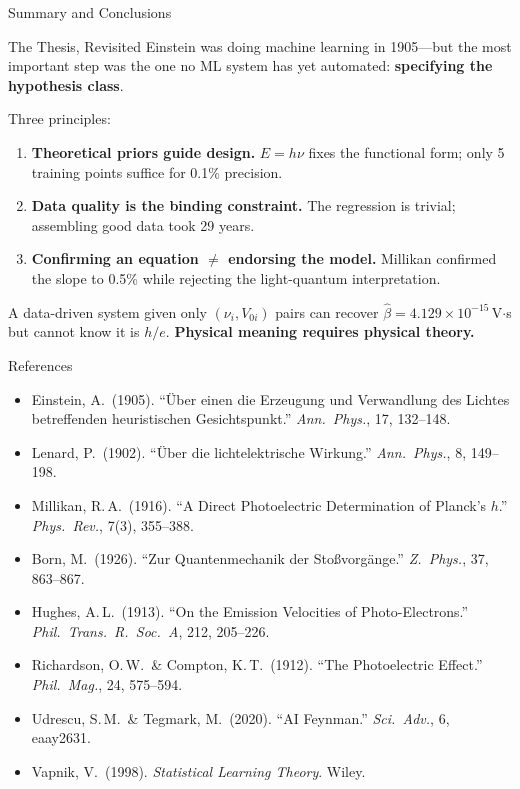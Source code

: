 \documentclass[aspectratio=169]{beamer}
\begin{document}
\begin{frame}{Summary and Conclusions}

\begin{block}{The Thesis, Revisited}
Einstein was doing machine learning in 1905---but the most important
step was the one no ML system has yet automated:
\textbf{specifying the hypothesis class}.
\end{block}

\bigskip
Three principles:
\begin{enumerate}
  \item \textbf{Theoretical priors guide design.} $E=h\nu$ fixes the
    functional form; only 5 training points suffice for 0.1\% precision.
  \item \textbf{Data quality is the binding constraint.} The regression
    is trivial; assembling good data took 29 years.
  \item \textbf{Confirming an equation $\neq$ endorsing the model.}
    Millikan confirmed the slope to 0.5\% while rejecting the
    light-quantum interpretation.
\end{enumerate}

\bigskip
A data-driven system given only $(\nu_i, V_{0i})$ pairs can recover
$\hat\beta = 4.129\times10^{-15}$\,V$\cdot$s but cannot know it is
$h/e$. \textbf{Physical meaning requires physical theory.}

\end{frame}

\begin{frame}{References}

\small
\begin{itemize}
  \item Einstein, A.\ (1905). ``\"Uber einen die Erzeugung und Verwandlung
    des Lichtes betreffenden heuristischen Gesichtspunkt.''
    \textit{Ann.\ Phys.}, 17, 132--148.
  \item Lenard, P.\ (1902). ``\"Uber die lichtelektrische Wirkung.''
    \textit{Ann.\ Phys.}, 8, 149--198.
  \item Millikan, R.\,A.\ (1916). ``A Direct Photoelectric Determination
    of Planck's $h$.'' \textit{Phys.\ Rev.}, 7(3), 355--388.
  \item Born, M.\ (1926). ``Zur Quantenmechanik der
    Sto{\ss}vorg\"ange.'' \textit{Z.\ Phys.}, 37, 863--867.
  \item Hughes, A.\,L.\ (1913). ``On the Emission Velocities of
    Photo-Electrons.'' \textit{Phil.\ Trans.\ R.\ Soc.\ A}, 212, 205--226.
  \item Richardson, O.\,W.\ \& Compton, K.\,T.\ (1912). ``The
    Photoelectric Effect.'' \textit{Phil.\ Mag.}, 24, 575--594.
  \item Udrescu, S.\,M.\ \& Tegmark, M.\ (2020). ``AI Feynman.''
    \textit{Sci.\ Adv.}, 6, eaay2631.
  \item Vapnik, V.\ (1998). \textit{Statistical Learning Theory}.
    Wiley.
\end{itemize}

\end{frame}

\end{document}
